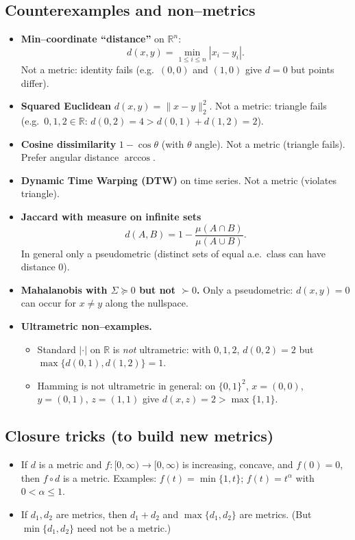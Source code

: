 \documentclass[12pt,a4paper]{article}
\begin{document}
\subsection*{Counterexamples and non--metrics}
\begin{itemize}
\item \textbf{Min--coordinate ``distance''} on $\mathbb{R}^n$:
\[
d(x,y)=\min_{1\le i\le n}|x_i-y_i|.
\]
Not a metric: identity fails (e.g.\ $(0,0)$ and $(1,0)$ give $d=0$ but points differ).
\item \textbf{Squared Euclidean} $d(x,y)=\|x-y\|_2^2$. Not a metric: triangle fails (e.g.\ $0,1,2\in\mathbb{R}$: $d(0,2)=4>d(0,1)+d(1,2)=2$).
\item \textbf{Cosine dissimilarity} $1-\cos\theta$ (with $\theta$ angle). Not a metric (triangle fails). Prefer angular distance $\arccos$.
\item \textbf{Dynamic Time Warping (DTW)} on time series. Not a metric (violates triangle).
\item \textbf{Jaccard with measure on infinite sets}
\[
d(A,B)=1-\frac{\mu(A\cap B)}{\mu(A\cup B)}.
\]
In general only a pseudometric (distinct sets of equal a.e.\ class can have distance $0$).
\item \textbf{Mahalanobis with $\Sigma\succeq0$ but not $\succ0$.} Only a pseudometric: $d(x,y)=0$ can occur for $x\ne y$ along the nullspace.
\item \textbf{Ultrametric non--examples.}
\begin{itemize}
\item Standard $|\cdot|$ on $\mathbb{R}$ is \emph{not} ultrametric: with $0,1,2$, $d(0,2)=2$ but $\max\{d(0,1),d(1,2)\}=1$.
\item Hamming is not ultrametric in general: on $\{0,1\}^2$, $x=(0,0)$, $y=(0,1)$, $z=(1,1)$ give $d(x,z)=2>\max\{1,1\}$.
\end{itemize}
\end{itemize}

\subsection*{Closure tricks (to build new metrics)}
\begin{itemize}
\item If $d$ is a metric and $f:[0,\infty)\to[0,\infty)$ is increasing, concave, and $f(0)=0$, then $f\circ d$ is a metric.
Examples: $f(t)=\min\{1,t\}$; $f(t)=t^\alpha$ with $0<\alpha\le1$.
\item If $d_1,d_2$ are metrics, then $d_1+d_2$ and $\max\{d_1,d_2\}$ are metrics.
(But $\min\{d_1,d_2\}$ need not be a metric.)
\end{itemize}
\end{document}
